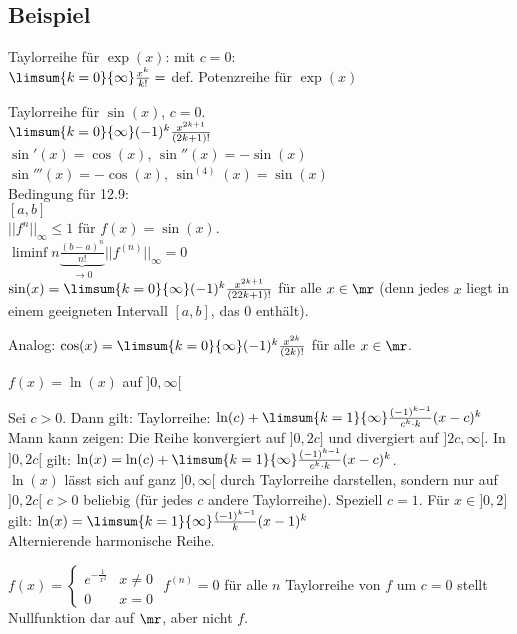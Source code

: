 \subsection{Beispiel}
	\item  Taylorreihe für $ \exp(x) $: mit $ c=0 $:\\
	$ \limsum{k=0}{\infty}\frac{x^k}{k!}= $ def. Potenzreihe für $ \exp(x) $
	\item  Taylorreihe für $ \sin(x) $, $ c=0 $.\\
	$ \limsum{k=0}{\infty}(-1)^k\frac{x^{2k+1}}{(2k+1)!} $\\
	$ \sin'(x)=\cos(x) $, $ \sin''(x)=-\sin(x) $\\
	$ \sin'''(x)=-\cos(x) $, $ \sin^{(4)}(x)=\sin(x) $\\
	Bedingung für 12.9:\\
	$ [a,b] $\\
	$ ||f^n||_\infty\leq 1 $ für $ f(x)=\sin(x) $.\\
	$ \liminf{n}\underbrace{\frac{(b-a)^n}{n!}}_{\rightarrow 0}||f^{(n)}||_\infty=0 $\\
	$ \sin(x)=\limsum{k=0}{\infty}(-1)^k\frac{x^{2k+1}}{(22k+1)!} $ für alle $ x\in\mr $ (denn jedes $ x $ liegt in einem geeigneten Intervall $ [a,b] $, das 0 enthält).
	\item Analog: $ \cos(x)=\limsum{k=0}{\infty}(-1)^k\frac{x^{2k}}{(2k)!} $ für alle $ x\in\mr $.
	\item $ f(x)=\ln(x) $ auf $ ]0,\infty[ $
	
	Sei $ c>0 $. Dann gilt:
	Taylorreihe: $ \ln(c)+\limsum{k=1}{\infty}\frac{(-1)^{k-1}}{c^k\cdot k}(x-c)^k $\\
	Mann kann zeigen: Die Reihe konvergiert auf $ ]0,2c] $ und divergiert auf $ ]2c,\infty[ $. In $ ]0,2c[ $ gilt: $ \ln(x)=\ln(c)+\limsum{k=1}{\infty}\frac{(-1)^{k-1}}{c^k\cdot k}(x-c)^k $.\\
	$ \ln(x) $ lässt sich auf ganz $ ]0,\infty[ $ durch Taylorreihe darstellen, sondern nur auf $ ]0,2c[ $ $ c>0 $ beliebig (für jedes $ c $ andere Taylorreihe). Speziell $ c=1 $. Für $ x\in]0,2] $ gilt: $ \ln(x)=\limsum{k=1}{\infty}\frac{(-1)^{k-1}}{k}(x-1)^k $\\
	Alternierende harmonische Reihe.
	\item  $ f(x)=\begin{cases}e^{-\frac{1}{x^2}}&x\neq 0\\0&x=0\end{cases} $
	$ f^{(n)}=0 $ für alle $ n $ Taylorreihe von $ f $ um $ c=0 $ stellt Nullfunktion dar auf $ \mr $, aber nicht $ f $.
	\subExEnd